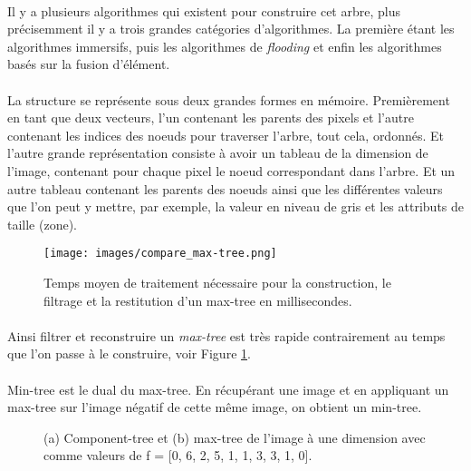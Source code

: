\documentclass[paper=a4, 11pt]{article}
\begin{document}
\paragraph{} Il y a plusieurs algorithmes qui existent pour construire cet arbre, plus précisemment il y a trois grandes catégories d'algorithmes. La première étant les algorithmes immersifs, puis les algorithmes de \textit{flooding} et enfin les algorithmes basés sur la fusion d'élément\cite{article3}.

\paragraph{} La structure se représente sous deux grandes formes en mémoire. Premièrement en tant que deux vecteurs, l'un contenant les parents des pixels et l'autre contenant les indices des noeuds pour traverser l'arbre, tout cela, ordonnés. Et l'autre grande représentation consiste à avoir un tableau de la dimension de l'image, contenant pour chaque pixel le noeud correspondant dans l'arbre. Et un autre tableau contenant les parents des noeuds ainsi que les différentes valeurs que l'on peut y mettre, par exemple, la valeur en niveau de gris et les attributs de taille (zone).

\begin{figure}[h]
\centering
\texttt{[image: images/compare\_max-tree.png]}
\caption{Temps moyen de traitement nécessaire pour la construction, le filtrage et la restitution d'un max-tree en millisecondes.}
\label{fig:averagemaxtree}
\end{figure}

\paragraph{} Ainsi filtrer et reconstruire un \textit{max-tree} est très rapide contrairement au temps que l'on passe à le construire, voir Figure \ref{fig:averagemaxtree}.


\paragraph{} Min-tree est le dual du max-tree. En récupérant une image et en appliquant un max-tree sur l'image négatif de cette même image, on obtient un min-tree.

\begin{figure}[h]
\centering
{}
\qquad
{}
\caption{(a) Component-tree et (b) max-tree de l'image à une dimension avec comme valeurs de f = [0, 6, 2, 5, 1, 1, 3, 3, 1, 0].}
\label{fig:compmax}
\end{figure}
\end{document}
